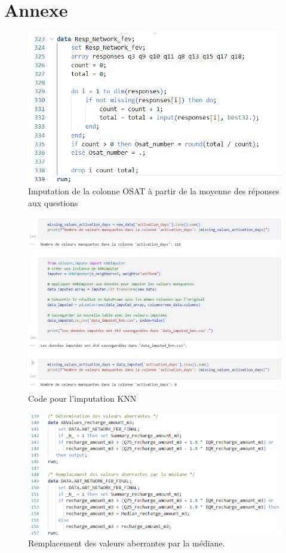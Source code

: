 \chapter*{Annexe}
\adjustmtc
\thispagestyle{MyStyle}

\makeatletter\renewcommand{}\makeatother

\appendix

\begin{figure}[H]
    \centering
    \includegraphics[width=0.6\linewidth]{capture_sas_1.png}
    \caption{Imputation de la colonne OSAT à partir de la moyenne des réponses aux questions}
    \label{imputation_code}
\end{figure}

\begin{figure}[H]
    \centering
    \includegraphics[width=0.8\linewidth]{capture_sas_6.png}
    \caption{Code pour l'imputation KNN}
    \label{fig:knn_code}
\end{figure}

\begin{figure}[H] 
    \centering 
    \includegraphics[width=0.7\linewidth]{capture_sas_7.png} 
    \caption{Remplacement des valeurs aberrantes par la médiane.}
    \label{fig:aberrant_values}
\end{figure}

